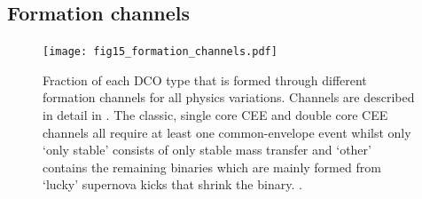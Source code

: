 \clearpage

\subsection{Formation channels}

\begin{figure}[h]
    \centering
    \texttt{[image: fig15\_formation\_channels.pdf]}
    \caption{Fraction of each DCO type that is formed through different formation channels for all physics variations. Channels are described in detail in \citet{Broekgaarden+2021}. The classic, single core CEE and double core CEE channels all require at least one common-envelope event whilst only `only stable' consists of only stable mass transfer and `other' contains the remaining binaries which are mainly formed from `lucky' supernova kicks that shrink the binary. \href{https://github.com/TomWagg/detecting-DCOs-in-LISA/blob/main/paper/figures/fig15_formation_channels.pdf}{\faFileImage} \href{https://github.com/TomWagg/detecting-DCOs-in-LISA/blob/main/paper/figure_notebooks/formation_channels.ipynb}{\faBook}. }
    \label{fig:formation_channels}
\end{figure}